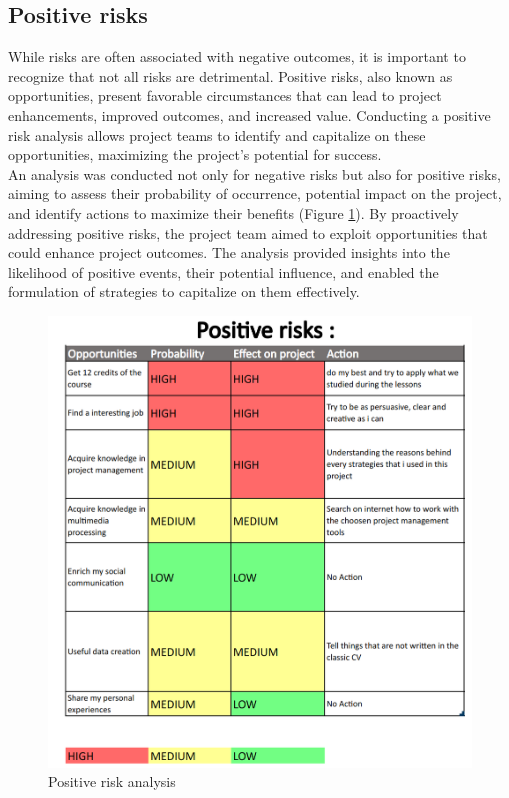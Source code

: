 \documentclass[eng]{class}
\begin{document}
\subsection{Positive risks}
While risks are often associated with negative outcomes, it is important to recognize that not all risks are detrimental.
Positive risks, also known as opportunities, present favorable circumstances that can lead to project enhancements, improved outcomes, and increased value.
Conducting a positive risk analysis allows project teams to identify and capitalize on these opportunities, maximizing the project's potential for success.\\
An analysis was conducted not only for negative risks but also for positive risks, aiming to assess their probability of occurrence,
potential impact on the project, and identify actions to maximize their benefits (Figure \ref{fig-5}).
By proactively addressing positive risks, the project team aimed to exploit opportunities that could enhance project outcomes.
The analysis provided insights into the likelihood of positive events, their potential influence, and enabled the formulation of strategies to
capitalize on them effectively.
\begin{figure}[h!]
  \centering
  \includegraphics[width=\columnwidth]{images/positive risks.png}
  \caption{Positive risk analysis}
  \label{fig-5}
\end{figure}
\end{document}
